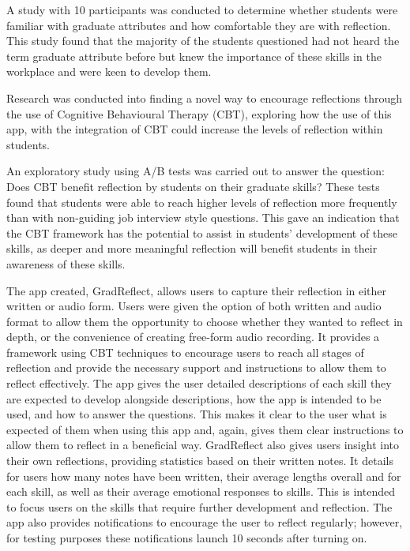 \documentclass{l4proj}
\begin{document}
A study with 10 participants was conducted to determine whether students were familiar with graduate attributes and how comfortable they are with reflection. This study found that the majority of the students questioned had not heard the term graduate attribute before but knew the importance of these skills in the workplace and were keen to develop them.

Research was conducted into finding a novel way to encourage reflections through the use of Cognitive Behavioural Therapy (CBT), exploring how the use of this app, with the integration of CBT could increase the levels of reflection within students. 

An exploratory study using A/B tests was carried out to answer the question: Does CBT benefit reflection by students on their graduate skills? These tests found that students were able to reach higher levels of reflection more frequently than with non-guiding job interview style questions. This gave an indication that the CBT framework has the potential to assist in students’ development of these skills, as deeper and more meaningful reflection will benefit students in their awareness of these skills.

The app created, GradReflect, allows users to capture their reflection in either written or audio form. Users were given the option of both written and audio format to allow them the opportunity to choose whether they wanted to reflect in depth, or the convenience of creating free-form audio recording. It provides a framework using CBT techniques to encourage users to reach all stages of reflection and provide the necessary support and instructions to allow them to reflect effectively. The app gives the user detailed descriptions of each skill they are expected to develop alongside descriptions, how the app is intended to be used, and how to answer the questions. This makes it clear to the user what is expected of them when using this app and, again, gives them clear instructions to allow them to reflect in a beneficial way. GradReflect also gives users insight into their own reflections, providing statistics based on their written notes. It details for users how many notes have been written, their average lengths overall and for each skill, as well as their average emotional responses to skills. This is intended to focus users on the skills that require further development and reflection. The app also provides notifications to encourage the user to reflect regularly; however, for testing purposes these notifications launch 10 seconds after turning on.
\end{document}
